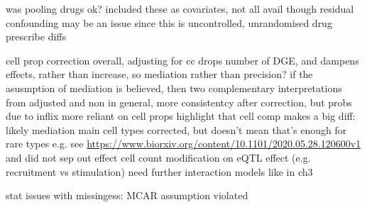 \begin{outline}
    \2 was pooling drugs ok?
        \3 included these as covariates, not all avail though
        \3 residual confounding may be an issue since this is uncontrolled, unrandomised
        \3 drug prescribe diffs

    \2 cell prop correction
        \3 overall, adjusting for cc drops number of DGE, and dampens effects, rather than increase, so mediation rather than precision?
        \3 if the asusmption of mediation is believed, then two complementary interpretations from adjusted and non
        \3 in general, more consistentcy after correction, but probs due to inflix more reliant on cell props
        \3 highlight that cell comp makes a big diff: likely mediation
         main cell types corrected, but doesn't mean that's enough for rare types e.g. see \url{https://www.biorxiv.org/content/10.1101/2020.05.28.120600v1} 
        \3 and did not sep out effect cell count modification on eQTL effect (e.g. recruitment vs stimulation)
        \3 need further interaction models like in ch3

    \2 stat issues with missingess: MCAR assumption violated



\end{outline}
